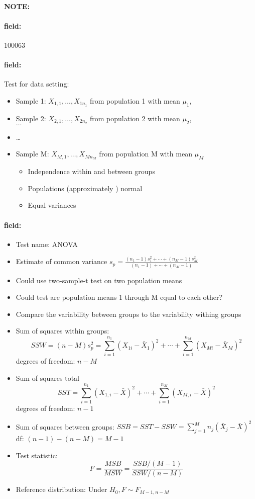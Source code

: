 \documentclass[12pt]{article}
\newenvironment{note}{\paragraph{NOTE:}}{}
\newenvironment{field}{\paragraph{field:}}{}
\begin{document}
\begin{note} \begin{field} \tiny 100063 \end{field}
 \begin{field}
  Test for data setting:
\begin{itemize}
  \item Sample 1: $X_{1,1}, \ldots , X_{1n_1}$ from population 1 with mean $\mu_1$,
  \item Sample 2: $X_{2,1}, \ldots , X_{2n_2}$ from population 2 with mean $\mu_2$,\\ $\ldots $
  \item \ldots
  \item Sample M: $X_{M,1}, \ldots , X_{Mn_M}$ from population M with mean $\mu_M$
  \begin{itemize}
    \item Independence within and between groups
    \item Populations (approximately ) normal
    \item Equal variances
  \end{itemize}
\end{itemize}
 \end{field}
 \begin{field}
  \begin{itemize}
   \item Test name: ANOVA
   \item Estimate of common variance $s_p = \frac{(n_1-1)s_1^2 + \cdots + (n_M -1)s_M^2}{(n_1-1) + \cdots + (n_M-1)}$
   \item Could use two-sample-t test on two population means
   \item Could test are population means 1 through M equal to each other?
   \item Compare the variability between groups to the variability withing groups
   \item Sum of squares within groups:
         $$ SSW = (n-M)s_p^2  = \sum_{i=1}^{n_1}(X_{1i} - \bar{X}_1)^2 + \cdots +  \sum_{i=1}^{n_M}(X_{Mi} - \bar{X}_M)^2$$
         degrees of freedom: $n-M$
   \item Sum of squares total
         $$ SST  = \sum_{i=1}^{n_1}(X_{1,i} - \bar{X})^2 + \cdots + \sum_{i=1}^{n_M} (X_{M,i} - \bar{X})^2$$
         degrees of freedom: $n-1$
   \item Sum of squares between groups: $ SSB = SST - SSW = \sum_{j=1}^Mn_j(\bar{X}_j - \bar{X})^2$ df: $(n-1) - (n-M) = M-1$
   \item Test statistic: $$ F = \frac{MSB}{MSW} = \frac{SSB/(M-1)}{SSW/(n-M)} $$
   \item Reference distribution: Under $H_0, F \sim F_{M-1, n-M}$
  \end{itemize}
 \end{field}
\end{note}
\end{document}
